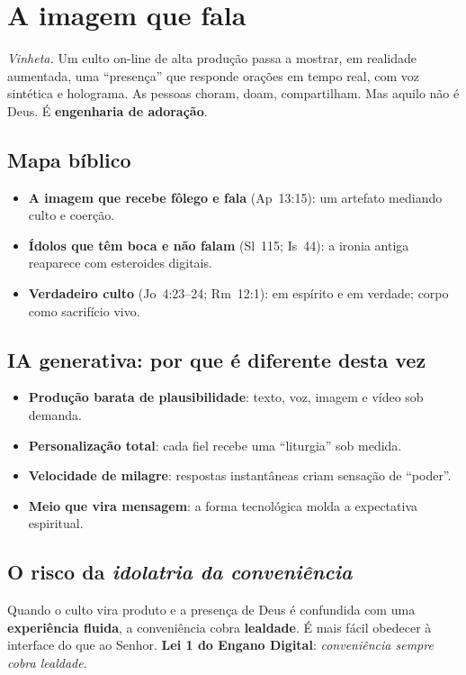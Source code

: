 \chapter{A imagem que fala}
\noindent\textit{Vinheta.} Um culto on-line de alta produção passa a mostrar, em realidade aumentada, uma ``presença'' que responde orações em tempo real, com voz sintética e holograma. As pessoas choram, doam, compartilham. Mas aquilo não é Deus. É \textbf{engenharia de adoração}.

\section{Mapa bíblico}
\begin{itemize}[leftmargin=*,noitemsep]
  \item \textbf{A imagem que recebe fôlego e fala} (Ap~13:15): um artefato mediando culto e coerção.
  \item \textbf{Ídolos que têm boca e não falam} (Sl~115; Is~44): a ironia antiga reaparece com esteroides digitais.
  \item \textbf{Verdadeiro culto} (Jo~4:23--24; Rm~12:1): em espírito e em verdade; corpo como sacrifício vivo.
\end{itemize}

\section{IA generativa: por que é diferente desta vez}
\begin{itemize}[leftmargin=*,noitemsep]
  \item \textbf{Produção barata de plausibilidade}: texto, voz, imagem e vídeo sob demanda.
  \item \textbf{Personalização total}: cada fiel recebe uma ``liturgia'' sob medida.
  \item \textbf{Velocidade de milagre}: respostas instantâneas criam sensação de ``poder''.
  \item \textbf{Meio que vira mensagem}: a forma tecnológica molda a expectativa espiritual.
\end{itemize}

\section{O risco da \emph{idolatria da conveniência}}
Quando o culto vira produto e a presença de Deus é confundida com uma \textbf{experiência fluida}, a conveniência cobra \textbf{lealdade}. É mais fácil obedecer à interface do que ao Senhor. \textbf{Lei 1 do Engano Digital}: \emph{conveniência sempre cobra lealdade}.

